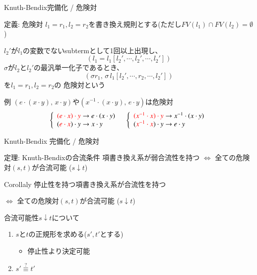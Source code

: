 \documentclass[dvipdfmx,11pt,notheorems]{beamer}
\theoremstyle{definition}
\newcommand{\red}[1]{{\color{red} #1}}
\begin{document}
\begin{frame}{Knuth-Bendix完備化 / 危険対}
  \begin{block}{定義: 危険対}
    $l_1 = r_1, l_2 = r_2$を書き換え規則とする(ただし$FV(l_1) \cap FV(l_2) = \emptyset$)

    $l_2'$が$l_1$の変数でないsubtermとして1回以上出現し、
    \[
    \left(l_1 = l_1 [l_2', \cdots, l_2', \cdots, l_2']\right)
    \]
    $\sigma$が$l_2$と$l_2'$の最汎単一化子であるとき、
    \[
    (\sigma r_1,\, \sigma \,l_1 [l_2', \cdots, r_2, \cdots, l_2'])
    \]
    を$l_1 = r_1, l_2 = r_2$の\red{危険対}という
  \end{block}

  \begin{exampleblock}{例}
    $(e \cdot (x \cdot y),\, x \cdot y)$や$(x^{-1} \cdot (x \cdot y),\, e \cdot y)$は危険対
    \vspace{-5pt}
    \[
    \begin{array}{ll}
      \left\{\begin{array}{l}
      \red{(e \cdot x) \cdot y} \rightarrow e \cdot (x \cdot y) \\
      (\red{e \cdot x}) \cdot y \rightarrow x \cdot y \\
      \end{array} \right.
      &
      \left\{
      \begin{array}{l}
      \red{(x^{-1}\cdot x) \cdot y} \rightarrow x^{-1} \cdot (x \cdot y) \\
      (\red{x^{-1}\cdot x}) \cdot y \rightarrow e \cdot y \\
      \end{array}
      \right. \\
    \end{array}
    \]
  \end{exampleblock}
\end{frame}

\begin{frame}{Knuth-Bendix 完備化 / 危険対}
  \begin{block}{定理: Knuth-Bendixの合流条件}
    項書き換え系が弱合流性を持つ
    $\Longleftrightarrow$ 全ての危険対$(s, t)$が合流可能 ($s \downarrow t$)
  \end{block}

  \begin{block}{Corollaly}
    停止性を持つ項書き換え系が合流性を持つ

    $\Longleftrightarrow$ 全ての危険対$(s, t)$が合流可能 ($s \downarrow t$)
  \end{block}

  \begin{block}{合流可能性$s \downarrow t$について}
    \begin{enumerate}
      \item $s$と$t$の正規形を求める($s', t'$とする)
      \begin{itemize}
        \item 停止性より決定可能
      \end{itemize}
      \item $s' \overset{?}{\equiv} t'$
    \end{enumerate}
  \end{block}
\end{frame}
\end{document}
